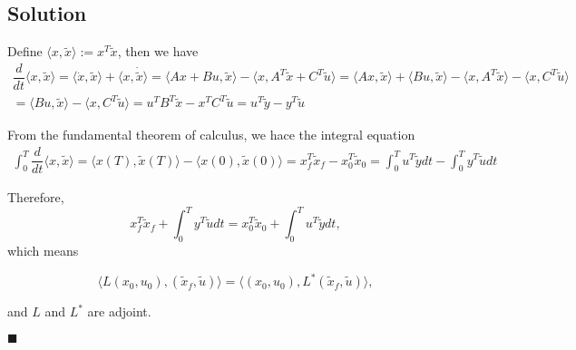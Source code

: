 \documentclass[11pt]{report}
\theoremstyle{definition}
\begin{document}
\subsection*{Solution}
Define $\langle x, \tilde x \rangle := x^T \tilde{x}$, then we have
\begin{multline*}
\dfrac{d}{dt} \langle x, \tilde x \rangle = \langle \dot{x}, \tilde{x} \rangle + \langle x, \dot{\tilde{x}} \rangle = \langle Ax + Bu, \tilde{x} \rangle - \langle x, A^T \tilde{x} + C^T \tilde{u} \rangle = \langle Ax, \tilde{x} \rangle + \langle Bu, \tilde{x} \rangle - \langle x, A^T \tilde{x} \rangle - \langle x, C^T \tilde{u} \rangle\\
  =\langle Bu, \tilde{x} \rangle - \langle x, C^T \tilde{u} \rangle = u^T B^T \tilde{x} - x^TC^T\tilde{u} = u^T \tilde{y} - y^T \tilde{u}
\end{multline*}

\noindent From the fundamental theorem of calculus, we hace the integral equation
\begin{multline*}
\int_{0}^{T} \dfrac{d}{dt} \langle x, \tilde x \rangle = \langle x(T), \tilde x(T) \rangle - \langle x(0), \tilde x(0) \rangle = x_f^T\tilde{x}_f - x_0^T\tilde{x}_0 = \int_{0}^{T} u^T \tilde{y} dt - \int_{0}^{T} y^T \tilde{u} dt
\end{multline*}

\noindent Therefore,
\begin{equation*}
x_f^T\tilde{x}_f + \int_{0}^{T} y^T \tilde{u} dt = x_0^T\tilde{x}_0 + \int_{0}^{T} u^T \tilde{y} dt,
\end{equation*}
which means

\begin{equation*}
\langle L(x_0, u_0), (\tilde{x}_f, \tilde{u}) \rangle = \langle (x_0, u_0), L^*(\tilde{x}_f, \tilde{u}) \rangle,
\end{equation*}

\noindent and $L$ and $L^*$ are adjoint.

\raggedleft $\blacksquare$
\end{document}
